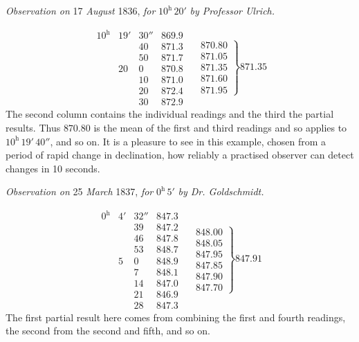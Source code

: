 \begin{center}\textit{Observation on} 17 \textit{August} 1836, \textit{for} $10^{\mathrm h}\,20'$ \textit{by Professor Ulrich.}\end{center}
\[
\begin{array}{rrr|r|}
10^{\mathrm h}&19'&30''&869.9\\
&&40&871.3\\
&&50&871.7\\
&20&0&870.8\\
&&10&871.0\\
&&20&872.4\\
&&30&872.9
\end{array}\quad
\left.\begin{array}{r}870.80\\871.05\\871.35\\871.60\\871.95\end{array}\right\}871.35
\]
The second column contains the individual readings and the third the partial results. Thus $870.80$ is the mean of the first and third readings and so applies to $10^{\mathrm h}\,19'\,40''$, and so on. It is a pleasure to see in this example, chosen from a period of rapid change in declination, how reliably a practised observer can detect changes in 10 seconds.

\begin{center}\textit{Observation on} 25 \textit{March} 1837, \textit{for} $0^{\mathrm h}\,5'$ \textit{by Dr. Goldschmidt.}\end{center}
\[
\begin{array}{rrr|r|}
0^{\mathrm h}&4'&32''&847.3\\
&&39&847.2\\
&&46&847.8\\
&&53&848.7\\
&5&0&848.9\\
&&7&848.1\\
&&14&847.0\\
&&21&846.9\\
&&28&847.3
\end{array}\quad
\left.\begin{array}{r}848.00\\848.05\\847.95\\847.85\\847.90\\847.70\end{array}\right\}847.91
\]
The first partial result here comes from combining the first and fourth readings, the second from the second and fifth, and so on.

